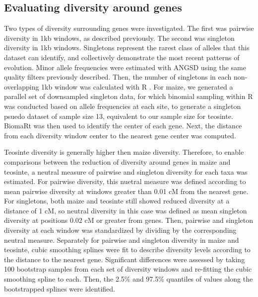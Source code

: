 \documentclass{pnastwo}
\begin{document}
\begin{article}
\begin{materials}
\subsection{Evaluating diversity around genes}
Two types of diversity surrounding genes were investigated. The first
was pairwise diversity in 1kb windows, as described previously. The
second was singleton diversity in 1kb windows. Singletons represent
the rarest class of alleles that this dataset can identify, and
collectively demonstrate the most recent patterns of evolution. Minor
allele frequencies were estimated with ANGSD \cite{korneliussen2014} using the
same quality filters previously described. Then, the number of
singletons in each non-overlapping 1kb window was calculated with R
\cite{R2014}. For maize, we generated a parallel set of downsampled
singleton data, for which binomial sampling within R was conducted
based on allele frequencies at each site, to generate a singleton
psuedo dataset of sample size 13, equivalent to our sample size for
teosinte. BiomaRt \cite{durinck2009, durinck2005} was then used to identify
the center of each gene. Next, the distance from each diversity window center
to the nearest gene center was computed.

Teosinte diversity is
generally higher then maize diversity. Therefore, to enable comparisons between
the reduction of diversity around genes in maize and teosinte, a
neutral measure of pairwise and singleton diversity for each taxa was
estimated. For pairwise diversity, this nuetral measure was defined according to
mean pairwise diversity at windows greater than 0.01 cM from the nearest
gene. For singletons, both maize and teosinte still showed reduced
diversity at a distance of 1 cM, so neutral diversity in this case was
defined as mean singleton diversity at positions 0.02 cM or greater
from genes. Then, pairwise and singleton diversity at each window was
standardized by dividing by the corresponding neutral
measure. Separately for pairwise and singleton diversity in maize and
teosinte, cubic smoothing splines were fit to
describe diversity levels according to the distance to the nearest
gene. Significant differences were assessed by taking 100 bootstrap
samples from each set of diversity windows and re-fitting the cubic smoothing spline to each. Then, the
2.5\% and 97.5\% quantiles of values along the bootstrapped splines
were identified.




\end{materials}
\end{article}
\end{document}
